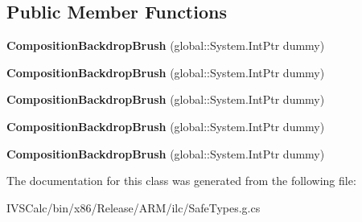 \subsection*{Public Member Functions}
\begin{DoxyCompactItemize}
\item 
\mbox{\label{class_windows_1_1_u_i_1_1_composition_1_1_composition_backdrop_brush_af533be135287d00aefbd99f0ae0e1432}} 
{\bfseries Composition\+Backdrop\+Brush} (global\+::\+System.\+Int\+Ptr dummy)
\item 
\mbox{\label{class_windows_1_1_u_i_1_1_composition_1_1_composition_backdrop_brush_af533be135287d00aefbd99f0ae0e1432}} 
{\bfseries Composition\+Backdrop\+Brush} (global\+::\+System.\+Int\+Ptr dummy)
\item 
\mbox{\label{class_windows_1_1_u_i_1_1_composition_1_1_composition_backdrop_brush_af533be135287d00aefbd99f0ae0e1432}} 
{\bfseries Composition\+Backdrop\+Brush} (global\+::\+System.\+Int\+Ptr dummy)
\item 
\mbox{\label{class_windows_1_1_u_i_1_1_composition_1_1_composition_backdrop_brush_af533be135287d00aefbd99f0ae0e1432}} 
{\bfseries Composition\+Backdrop\+Brush} (global\+::\+System.\+Int\+Ptr dummy)
\item 
\mbox{\label{class_windows_1_1_u_i_1_1_composition_1_1_composition_backdrop_brush_af533be135287d00aefbd99f0ae0e1432}} 
{\bfseries Composition\+Backdrop\+Brush} (global\+::\+System.\+Int\+Ptr dummy)
\end{DoxyCompactItemize}


The documentation for this class was generated from the following file\+:\begin{DoxyCompactItemize}
\item 
I\+V\+S\+Calc/bin/x86/\+Release/\+A\+R\+M/ilc/Safe\+Types.\+g.\+cs\end{DoxyCompactItemize}
